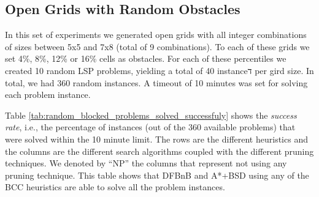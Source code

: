 \documentclass[letterpaper]{article} %
\begin{document}
\subsection{Open Grids with Random Obstacles}

In this set of experiments we generated open grids with all integer combinations of sizes between 5x5 and 7x8 (total of 9 combinations). To each of these grids we set 4\%, 8\%, 12\% or 16\% cells as obstacles. For each of these percentiles we created 10 random LSP problems, yielding a total of 40 instanceד per gird size. In total, we had 360 random instances. A timeout of 10 minutes was set for solving each problem instance. %



Table \ref{tab:random_blocked_problems_solved_successfuly} shows the \emph{success rate}, i.e., the percentage of instances (out of the 360 available problems) that were solved within the 10 minute limit. The rows are the different heuristics and the columns are the different search algorithms coupled with the different pruning techniques. 
We denoted by ``NP'' the columns that represent not using any pruning technique. This table shows that DFBnB
and A*+BSD using any of the BCC heuristics are able to solve all the problem instances. 
\end{document}
